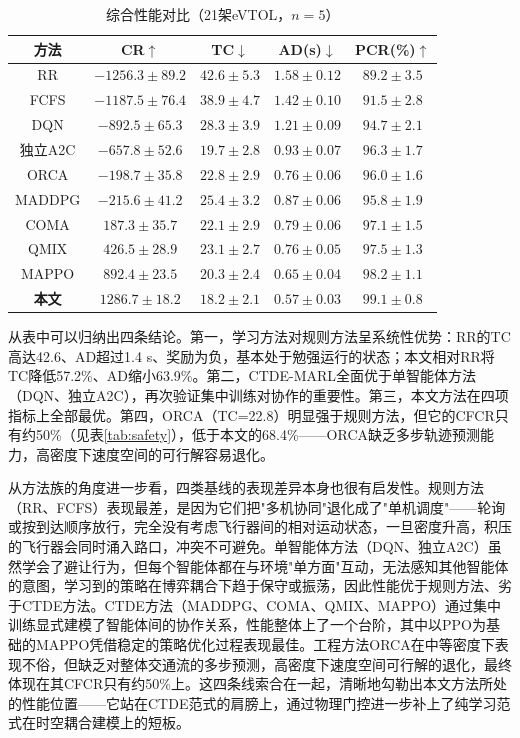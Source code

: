 \documentclass[12pt,a4paper,UTF8]{ctexart}
\begin{document}
\begin{table}[H]
    \centering
    \caption{综合性能对比（21架eVTOL，$n=5$）}
    \label{tab:comparison}
    \begin{tabular}{|c|c|c|c|c|}
        \hline
        \textbf{方法} & \textbf{CR$\uparrow$} & \textbf{TC$\downarrow$} & \textbf{AD(s)$\downarrow$} & \textbf{PCR(\%)$\uparrow$} \\
        \hline
        RR & $-1256.3\pm89.2$ & $42.6\pm5.3$ & $1.58\pm0.12$ & $89.2\pm3.5$ \\
        FCFS & $-1187.5\pm76.4$ & $38.9\pm4.7$ & $1.42\pm0.10$ & $91.5\pm2.8$ \\
        DQN & $-892.5\pm65.3$ & $28.3\pm3.9$ & $1.21\pm0.09$ & $94.7\pm2.1$ \\
        独立A2C & $-657.8\pm52.6$ & $19.7\pm2.8$ & $0.93\pm0.07$ & $96.3\pm1.7$ \\
        ORCA & $-198.7\pm35.8$ & $22.8\pm2.9$ & $0.76\pm0.06$ & $96.0\pm1.6$ \\
        MADDPG & $-215.6\pm41.2$ & $25.4\pm3.2$ & $0.87\pm0.06$ & $95.8\pm1.9$ \\
        COMA & $187.3\pm35.7$ & $22.1\pm2.9$ & $0.79\pm0.06$ & $97.1\pm1.5$ \\
        QMIX & $426.5\pm28.9$ & $23.1\pm2.7$ & $0.76\pm0.05$ & $97.5\pm1.3$ \\
        MAPPO & $892.4\pm23.5$ & $20.3\pm2.4$ & $0.65\pm0.04$ & $98.2\pm1.1$ \\
        \textbf{本文} & $\mathbf{1286.7\pm18.2}$ & $\mathbf{18.2\pm2.1}$ & $\mathbf{0.57\pm0.03}$ & $\mathbf{99.1\pm0.8}$ \\
        \hline
    \end{tabular}
\end{table}

从表中可以归纳出四条结论。第一，学习方法对规则方法呈系统性优势：RR的TC高达42.6、AD超过1.4 s、奖励为负，基本处于勉强运行的状态；本文相对RR将TC降低57.2\%、AD缩小63.9\%。第二，CTDE-MARL全面优于单智能体方法（DQN、独立A2C），再次验证集中训练对协作的重要性。第三，本文方法在四项指标上全部最优。第四，ORCA（TC=22.8）明显强于规则方法，但它的CFCR只有约50\%（见表\ref{tab:safety}），低于本文的68.4\%——ORCA缺乏多步轨迹预测能力，高密度下速度空间的可行解容易退化。

从方法族的角度进一步看，四类基线的表现差异本身也很有启发性。规则方法（RR、FCFS）表现最差，是因为它们把"多机协同"退化成了"单机调度"——轮询或按到达顺序放行，完全没有考虑飞行器间的相对运动状态，一旦密度升高，积压的飞行器会同时涌入路口，冲突不可避免。单智能体方法（DQN、独立A2C）虽然学会了避让行为，但每个智能体都在与环境"单方面"互动，无法感知其他智能体的意图，学习到的策略在博弈耦合下趋于保守或振荡，因此性能优于规则方法、劣于CTDE方法。CTDE方法（MADDPG、COMA、QMIX、MAPPO）通过集中训练显式建模了智能体间的协作关系，性能整体上了一个台阶，其中以PPO为基础的MAPPO凭借稳定的策略优化过程表现最佳。工程方法ORCA在中等密度下表现不俗，但缺乏对整体交通流的多步预测，高密度下速度空间可行解的退化，最终体现在其CFCR只有约50\%上。这四条线索合在一起，清晰地勾勒出本文方法所处的性能位置——它站在CTDE范式的肩膀上，通过物理门控进一步补上了纯学习范式在时空耦合建模上的短板。
\end{document}
